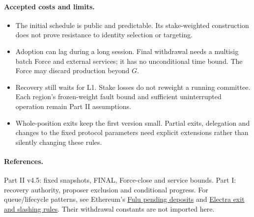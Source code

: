 \documentclass[11pt,a4paper]{article}
\begin{document}
\paragraph{Accepted costs and limits.}
\begin{itemize}[itemsep=3pt]
\item The initial schedule is public and predictable. Its stake-weighted
construction does not prove resistance to identity selection or targeting.
\item Adoption can lag during a long session. Final withdrawal needs a
multisig batch Force and external services; it has no unconditional time
bound. The Force may discard production beyond $G$.
\item Recovery still waits for L1. Stake losses do not reweight a running
committee. Each region's frozen-weight fault bound and sufficient
uninterrupted operation remain Part II assumptions.
\item Whole-position exits keep the first version small. Partial exits,
delegation and changes to the fixed protocol parameters need explicit
extensions rather than silently changing these rules.
\end{itemize}

\paragraph{References.}
Part II v4.5: fixed snapshots, FINAL, Force-close and service bounds.
Part I: recovery authority, proposer exclusion and conditional progress.
For queue/lifecycle patterns, see Ethereum's
\href{https://ethereum.github.io/consensus-specs/specs/fulu/beacon-chain/}{Fulu pending deposits}
and \href{https://ethereum.github.io/consensus-specs/specs/electra/beacon-chain/}{Electra exit and slashing rules}.
Their withdrawal constants are not imported here.
\end{document}
